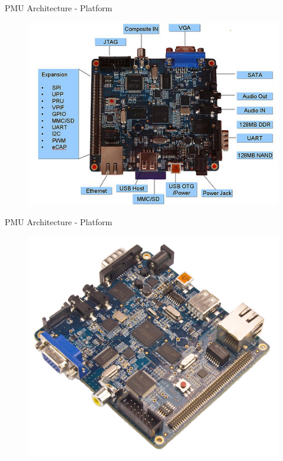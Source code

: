 \documentclass{beamer}
\begin{document}
\begin{frame}{PMU Architecture - Platform}
\begin{figure}
\includegraphics[scale=0.8]{fig/Hawkboard_hw.jpg}
\end{figure}
\end{frame}

\begin{frame}{PMU Architecture - Platform}
\begin{figure}
\includegraphics[scale=0.39]{fig/hwkbrd.jpg}
\end{figure}
\end{frame}
\end{document}
